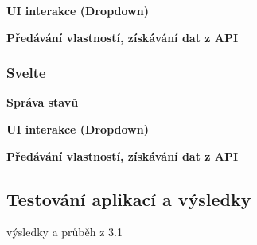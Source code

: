 \begin{flushleft}
  \textbf{UI interakce (Dropdown)}
\end{flushleft}

\begin{flushleft}
  \textbf{Předávání vlastností, získávání dat z API}
\end{flushleft}

\subsubsection{Svelte}

\begin{flushleft}
  \textbf{Správa stavů}
\end{flushleft}

\begin{flushleft}
  \textbf{UI interakce (Dropdown)}
\end{flushleft}

\begin{flushleft}
  \textbf{Předávání vlastností, získávání dat z API}
\end{flushleft}

\subsection{Testování aplikací a výsledky}

\begin{citemize}
	\item výsledky a průběh z 3.1
\end{citemize}
